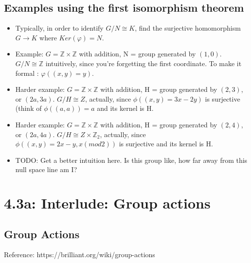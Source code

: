 \documentclass[11pt, oneside]{article}   	%
\begin{document}
\subsection{Examples using the first isomorphism theorem}
\begin{itemize}
\item Typically, in order to identify $G/N \cong K$, find the surjective homomorphism $G \rightarrow K$ where $Ker(\varphi) = N$.
\item Example: $G = \mathbb{Z} \times \mathbb{Z}$ with addition, N = group generated by $(1,0)$.  $G/N \cong \mathbb{Z}$ intuitively, since you're forgetting the first coordinate.  To make it formal : $\varphi((x,y) = y)$.  
\item Harder example: $G = \mathbb{Z} \times \mathbb{Z}$ with addition, H = group generated by $(2,3)$, or $(2a, 3a)$.  $G/H \cong Z$, actually, since $\phi((x,y) = 3x - 2y)$ is surjective (think of $\phi((a, a)) = a$ and its kernel is H.
\item Harder example: $G = \mathbb{Z} \times \mathbb{Z}$ with addition, H = group generated by $(2,4)$, or $(2a, 4a)$.  $G/H \cong Z \times \mathbb{Z}_2$, actually, since $\phi((x,y) = 2x  - y, x (mod 2))$ is surjective and its kernel is H.
\item TODO: Get a better intuition here.  Is this group like, how far away from this null space line am I?
\end{itemize}

\section{4.3a: Interlude: Group actions}

\subsection{Group Actions}
Reference: https://brilliant.org/wiki/group-actions
\end{document}
